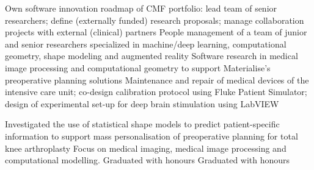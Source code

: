 \documentclass[
	a4paper,
	sidesectionsize=Large,
	maincolor=DarkSlateGray,
	sectioncolor=DarkSlateGray,
	sidecolor=DarkSlateGray!10,
	topbottommargin=0.02\paperheight,
	leftrightmargin=0.02\paperwidth,
	profilepiczoom=1.6,
	profilepicxshift=-1mm,
	profilepicyshift=-7mm,
	profilepicrounding=0.5cm,
]{fortysecondscv}
\begin{document}
\makefrontsidebar
\newlength{\firstpagespacing}
\setlength{\firstpagespacing}{4ex}

\vspace{\firstpagespacing}
\vspace*{-1ex}
\begin{cvtable}[3.5]
	{Own software innovation roadmap of CMF portfolio: lead team of senior researchers; define (externally funded) research proposals; manage collaboration projects with external (clinical) partners}
	{People management of a team of junior and senior researchers specialized in machine/deep learning, computational geometry, shape modeling and augmented reality}
	{Software research in medical image processing and computational geometry to support Materialise's preoperative planning solutions}
	{Maintenance and repair of medical devices of the intensive care unit; co-design calibration protocol using Fluke Patient Simulator; design of experimental set-up for deep brain stimulation using LabVIEW}
\end{cvtable}

\vspace{\firstpagespacing}
\vspace*{-1ex}
\begin{cvtable}[3.5]	
	{Investigated the use of statistical shape models to predict patient-specific information to support mass personalisation of preoperative planning for total knee arthroplasty}
		{Focus on medical imaging, medical image processing and computational modelling. Graduated with honours}
		{Graduated with honours}
\end{cvtable}
\end{document}

